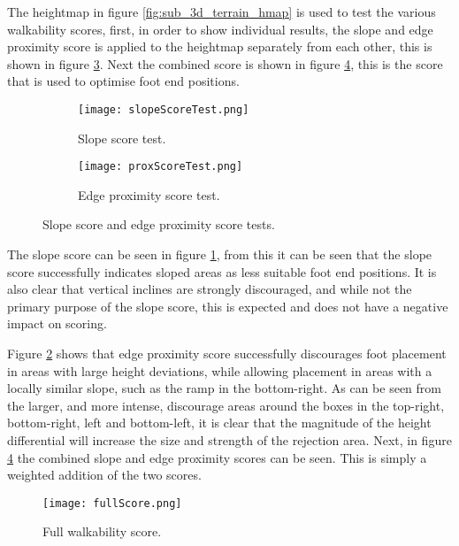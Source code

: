     \noindent
    The heightmap in figure \ref{fig:sub_3d_terrain_hmap} is used to test the various walkability scores, first, in order to show individual results,
    the slope and edge proximity score is applied to the heightmap separately from each other, this is shown in figure \ref{fig:scores_seperate}. Next the combined score is
    shown in figure \ref{fig:full_score}, this is the score that is used to optimise foot end positions.
    \begin{figure}[h]
        \centering
        \begin{subfigure}{.45\textwidth}
            \texttt{[image: slopeScoreTest.png]}
            \caption{Slope score test.}
            \label{fig:sub_slope_test}
        \end{subfigure}%
        \begin{subfigure}{.45\textwidth}
            \texttt{[image: proxScoreTest.png]}
            \caption{Edge proximity score test.}
            \label{fig:sub_prox_test}
        \end{subfigure}
        \caption{Slope score and edge proximity score tests.}
        \label{fig:scores_seperate}
    \end{figure}
    The slope score can be seen in figure \ref{fig:sub_slope_test}, from this it can be seen that the slope score successfully indicates sloped areas
    as less suitable foot end positions. It is also clear that vertical inclines are strongly discouraged, and while not the primary purpose of the slope
    score, this is expected and does not have a negative impact on scoring.

    Figure \ref{fig:sub_prox_test} shows that edge proximity score successfully discourages foot placement in areas with large height deviations,
    while allowing placement in areas with a locally similar slope, such as the ramp in the bottom-right. As can be seen from the larger, and more intense, discourage areas around the boxes in the
    top-right, bottom-right, left and bottom-left, it is clear that the magnitude of the height differential will increase the size and strength of the rejection area.
    Next, in figure \ref{fig:full_score} the combined slope and edge proximity scores can be seen. This is simply a weighted addition of the two scores.
    \begin{figure}[h]
        \centering
        \texttt{[image: fullScore.png]}
        \caption{Full walkability score.}
        \label{fig:full_score}
    \end{figure}

